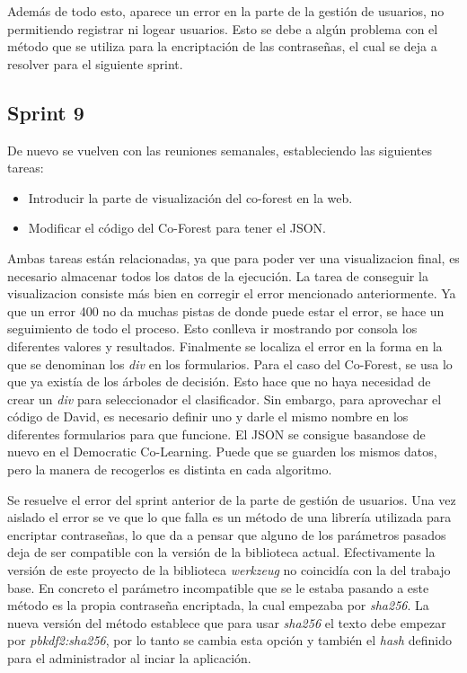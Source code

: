Además de todo esto, aparece un error en la parte de la gestión de usuarios, no permitiendo registrar ni logear usuarios. Esto se debe a algún problema con el método que se utiliza para la encriptación de las contraseñas, el cual se deja a resolver para el siguiente sprint.

\subsection{Sprint 9}
De nuevo se vuelven con las reuniones semanales, estableciendo las siguientes tareas:
 \begin{itemize}
	\item Introducir la parte de visualización del co-forest en la web.
	\item Modificar el código del Co-Forest para tener el JSON.
	
\end{itemize}

Ambas tareas están relacionadas, ya que para poder ver una visualizacion final, es necesario almacenar todos los datos de la ejecución. La tarea de conseguir la visualizacion consiste más bien en corregir el error mencionado anteriormente. Ya que un error 400 no da muchas pistas de donde puede estar el error, se hace un seguimiento de todo el proceso. Esto conlleva ir mostrando por consola los diferentes valores y resultados. Finalmente se localiza el error en la forma en la que se denominan los \textit{div} en los formularios. Para el caso del Co-Forest, se usa lo que ya existía de los árboles de decisión. Esto hace que no haya necesidad de crear un \textit{div} para seleccionador el clasificador. Sin embargo, para aprovechar el código de David, es necesario definir uno y darle el mismo nombre en los diferentes formularios para que funcione.
El JSON se consigue basandose de nuevo en el Democratic Co-Learning. Puede que se guarden los mismos datos, pero la manera de recogerlos es distinta en cada algoritmo.

Se resuelve el error del sprint anterior de la parte de gestión de usuarios. Una vez aislado el error se ve que lo que falla es un método de una librería utilizada para encriptar contraseñas, lo que da a pensar que alguno de los parámetros pasados deja de ser compatible con la versión de la biblioteca actual. Efectivamente la versión de este proyecto de la biblioteca \textit{werkzeug} no coincidía con la del trabajo base. En concreto el parámetro incompatible que se le estaba pasando a este método es la propia contraseña encriptada, la cual empezaba por \textit{sha256}. La nueva versión del método establece que para usar \textit{sha256} el texto debe empezar por \textit{pbkdf2:sha256}, por lo tanto se cambia esta opción y también el \textit{hash} definido para el administrador al inciar la aplicación.

